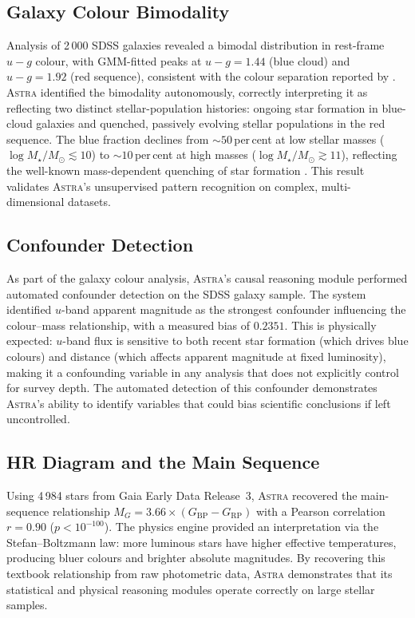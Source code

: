 \documentclass[usenatbib]{rasti}
\newcommand{\astra}{\textsc{Astra}\xspace}
\begin{document}
\subsection{Galaxy Colour Bimodality}
\label{sec:live:bimodality}

Analysis of 2\,000 SDSS galaxies revealed a bimodal distribution in rest-frame $u{-}g$ colour, with GMM-fitted peaks at $u{-}g = 1.44$ (blue cloud) and $u{-}g = 1.92$ (red sequence), consistent with the colour separation reported by \citet{Strateva2001}.
\astra identified the bimodality autonomously, correctly interpreting it as reflecting two distinct stellar-population histories: ongoing star formation in blue-cloud galaxies and quenched, passively evolving stellar populations in the red sequence.
The blue fraction declines from ${\sim}50$\,per\,cent at low stellar masses ($\log M_{\star}/M_{\odot} \lesssim 10$) to ${\sim}10$\,per\,cent at high masses ($\log M_{\star}/M_{\odot} \gtrsim 11$), reflecting the well-known mass-dependent quenching of star formation \citep{Peng2010}.
This result validates \astra's unsupervised pattern recognition on complex, multi-dimensional datasets.

\subsection{Confounder Detection}
\label{sec:live:confounders}

As part of the galaxy colour analysis, \astra's causal reasoning module performed automated confounder detection on the SDSS galaxy sample.
The system identified $u$-band apparent magnitude as the strongest confounder influencing the colour--mass relationship, with a measured bias of $0.2351$.
This is physically expected: $u$-band flux is sensitive to both recent star formation (which drives blue colours) and distance (which affects apparent magnitude at fixed luminosity), making it a confounding variable in any analysis that does not explicitly control for survey depth.
The automated detection of this confounder demonstrates \astra's ability to identify variables that could bias scientific conclusions if left uncontrolled.

\subsection{HR Diagram and the Main Sequence}
\label{sec:live:hr}

Using 4\,984 stars from Gaia Early Data Release~3, \astra recovered the main-sequence relationship $M_{G} = 3.66 \times (G_{\mathrm{BP}} - G_{\mathrm{RP}})$ with a Pearson correlation $r = 0.90$ ($p < 10^{-100}$).
The physics engine provided an interpretation via the Stefan--Boltzmann law: more luminous stars have higher effective temperatures, producing bluer colours and brighter absolute magnitudes.
By recovering this textbook relationship from raw photometric data, \astra demonstrates that its statistical and physical reasoning modules operate correctly on large stellar samples.
\end{document}
